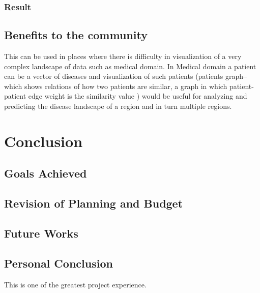 \subsubsection{Result}
\subsection{Benefits to the community}
This can be used in places where there is difficulty in visualization of a very complex landscape
of data such as medical domain. In Medical domain a patient can be a vector of diseases and
visualization of such patients (patients graph–which shows relations of how two patients are
similar, a graph in which patient-patient edge weight is the similarity value ) would be useful for
analyzing and predicting the disease landscape of a region and in turn multiple regions.

\section{Conclusion}
\subsection{Goals Achieved}
\subsection{Revision of Planning and Budget}
\subsection{Future Works}
\subsection{Personal Conclusion}
This is one of the greatest project experience.	







